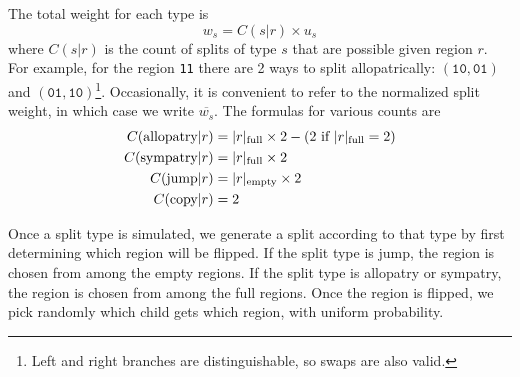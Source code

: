 \documentclass{article}
\begin{document}
The total weight for each type is
\begin{equation}
	w_s = C(s|r) \times u_s
\end{equation}
where $C(s|r)$ is the count of splits of type $s$ that are
possible given region $r$.
For example, for the region \texttt{11} there are 2 ways to split
allopatrically: $(\texttt{10}, \texttt{01})$ and $(\texttt{01},
\texttt{10})$\footnote{Left and right branches are distinguishable, so swaps
	are also valid.}\footnotemark.
Occasionally, it is convenient to refer to the normalized split weight, in
which case we write \( \overline{w_s} \).
The formulas for various counts are
\begin{align*}
  C(\text{allopatry}|r) & =
  |r|_\text{full} \times 2 - (2 \text{ if } |r|_\text{full} = 2) \\
  C(\text{sympatry}|r)  & = |r|_\text{full} \times 2           \\ C(\text{jump}|r) & =
  |r|_\text{empty} \times 2                                    \\ C(\text{copy}|r) & = 2 \\
\end{align*}


Once a split type is simulated, we generate
a split according to that type by first determining which region will be
flipped\footnotemark.
If the split type is jump, the region is chosen from among the empty regions.
If the split type is allopatry or sympatry, the region is chosen from among the
full regions.
Once the region is flipped, we pick randomly which child gets which region,
with uniform probability.

\end{document}

